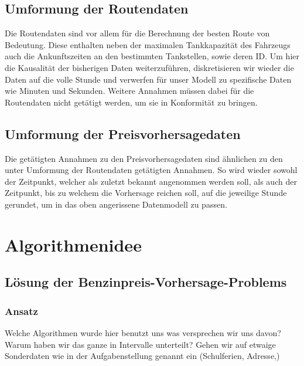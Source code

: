 \documentclass[11pt]{article}
\begin{document}
\subsection{Umformung der Routendaten}
	Die Routendaten sind vor allem für die Berechnung der besten Route von Bedeutung. Diese enthalten neben der maximalen Tankkapazität des Fahrzeugs auch die Ankunftszeiten an den bestimmten Tankstellen, sowie deren ID. Um hier die Kausalität der bisherigen Daten weiterzuführen, diskretisieren wir wieder die Daten auf die volle Stunde und verwerfen für unser Modell zu spezifische  Daten wie Minuten und Sekunden. Weitere Annahmen müssen dabei für die Routendaten nicht getätigt werden, um sie in Konformität zu bringen.
\subsection{Umformung der Preisvorhersagedaten}
	Die getätigten Annahmen zu den Preisvorhersagedaten sind ähnlichen zu den unter \glqq Umformung der Routendaten\grqq{} getätigten Annahmen. So wird wieder sowohl der Zeitpunkt, welcher als zuletzt bekannt angenommen werden soll, als auch der Zeitpunkt, bis zu welchem die Vorhersage reichen soll, auf die jeweilige Stunde gerundet, um in das oben angerissene Datenmodell zu passen.



\section{Algorithmenidee}
\subsection{Lösung der Benzinpreis-Vorhersage-Problems}
\subsubsection{Ansatz}
	Welche Algorithmen wurde hier benutzt uns was versprechen wir uns davon? Warum haben wir das ganze in Intervalle unterteilt? Gehen wir auf etwaige Sonderdaten wie in der Aufgabenstellung genannt ein (Schulferien, Adresse,) 
	
\end{document}
